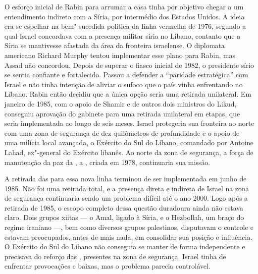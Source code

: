 O esforço inicial de Rabin para arrumar a casa tinha por objetivo chegar
a um entendimento indireto com a Síria, por intermédio dos Estados
Unidos. A ideia era se espelhar na bem"-sucedida política da linha
vermelha de 1976, segundo a qual Israel concordava com a presença
militar síria no Líbano, contanto que a Síria se mantivesse afastada da
área da fronteira israelense. O diplomata americano Richard Murphy
tentou implementar esse plano para Rabin, mas Assad não concordou. Depois
de superar o fiasco inicial de 1982, o presidente sírio se sentia
confiante e fortalecido. Passou a defender a ``paridade estratégica''
com Israel e não tinha intenção de aliviar o sufoco que o país vinha
enfrentando no Líbano. Rabin então decidiu que a única opção seria uma
retirada unilateral. Em janeiro de 1985, com o apoio de Shamir e de
outros dois ministros do Likud, conseguiu aprovação do gabinete para uma
retirada unilateral em etapas, que seria implementada ao longo de seis
meses. Israel protegeria sua fronteira ao norte com uma zona de
segurança de dez quilômetros de profundidade e o apoio de uma milícia
local avançada, o Exército do Sul do Líbano, comandado por Antoine
Lahad, ex"-general do Exército libanês. Ao norte da zona de segurança, a
força de manutenção da paz da , a , criada em 1978, continuaria
sua missão.

A retirada das  para essa nova linha terminou de ser implementada em
junho de 1985. Não foi uma retirada total, e a presença direta
e indireta de Israel na zona de segurança continuaria sendo um problema
difícil até o ano 2000. Logo após a retirada de 1985, o escopo completo
dessa questão duradoura ainda não estava claro. Dois grupos xiitas --- o
Amal, ligado à Síria, e o Hezbollah, um braço do regime iraniano ---, bem
como diversos grupos palestinos, disputavam o controle e estavam
preocupados, antes de mais nada, em consolidar sua posição e influência.
O Exército do Sul do Líbano não conseguia se manter de forma
independente e precisava do reforço das , presentes na zona de
segurança. Israel tinha de enfrentar provocações e baixas, mas o
problema parecia controlável.


